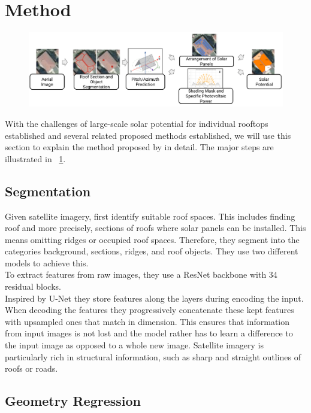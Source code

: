 \documentclass{article} %
\newcommand{\figref}[1]{\figurename~\ref{#1}}
\begin{document}
\section*{Method}
\begin{figure}
	\centering
	\includegraphics[width=\linewidth]{../figures/fig_1.pdf}
	\caption{}
	\label{fig:arch}
\end{figure}
With the challenges of large-scale solar potential for individual rooftops established and several related proposed methods established, we will use this section to explain the method proposed by \citet*{de2021predicting} in detail. The major steps are illustrated in \figref{fig:arch}.\\
\subsection*{Segmentation}
Given satellite imagery, \citet{de2021predicting} first identify suitable roof spaces. This includes finding roof and more precisely, sections of roofs where solar panels can be installed. This means omitting ridges or occupied roof spaces. Therefore, they segment into the categories background, sections, ridges, and roof objects. They use two different models to achieve this. \cite{de2021predicting}\\
To extract features from raw images, they use a ResNet backbone \cite{he2016deep} with 34 residual blocks.\\
Inspired by U-Net \cite{ronneberger2015u} they store features along the layers during encoding the input. When decoding the features they progressively concatenate these kept features with upsampled ones that match in dimension. This ensures that information from input images is not lost and the model rather has to learn a difference to the input image as opposed to a whole new image. Satellite imagery is particularly rich in structural information, such as sharp and straight outlines of roofs or roads.\\



\subsection*{Geometry Regression}
\end{document}
